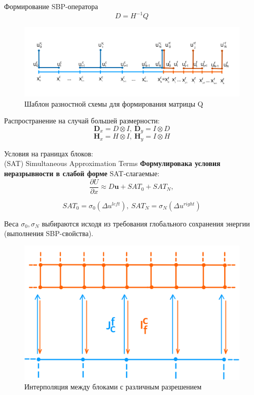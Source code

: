 \documentclass[10pt]{beamer}
\begin{document}
\begin{frame}{Формирование SBP-оператора}
$$D=H^{-1}Q$$
\begin{figure}[h]
\centering
\includegraphics[width=0.9\linewidth]{./images/Q_scheme.png}
\caption{Шаблон разностной схемы для формирования матрицы Q}
\label{fig:mpr}
\end{figure}

Распространение на случай большей размерности:
$$\textbf{D}_x = D\otimes I, \ \textbf{D}_y = I \otimes D$$
$$\textbf{H}_x = H\otimes I, \ \textbf{H}_y = I \otimes H$$
\end{frame}




\begin{frame}{Условия на границах блоков: \\ (SAT) Simultaneous Approximation Terms}
\textbf{Формулировака условия неразрывности в слабой форме}
SAT-слагаемые:
$$\frac{\partial U}{\partial x}\approx D\textbf{u} + SAT_0 + SAT_N,$$

$$SAT_0=\sigma_0 (\Delta u^{left}), \ SAT_N=\sigma_N(\Delta u^{right})$$

Веса $\sigma_0, \sigma_N$ выбираются исходя из требования глобального сохранения энергии (выполнения SBP-свойства).

\begin{figure}[h]
\centering
\includegraphics[width=0.5\linewidth]{./images/interp.png}
\caption{Интерполяция между блоками с различным разрешением}
\label{fig:mpr}
\end{figure}

\end{frame}
\end{document}
